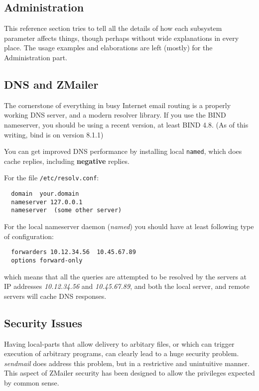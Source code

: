 \begin{htmlonly}


\section{Administration}
\end{htmlonly}

This reference section tries to tell all the details of how each
subsystem parameter affects things, though perhaps without wide
explanations in every place. The usage examples and elaborations
are left (mostly) for the Administration part.

%
%

\subsection{DNS and ZMailer}

The cornerstone of everything in busy Internet email routing is a properly
working DNS server, and a modern resolver library. If you use the BIND 
nameserver, you should be using a recent version, at least BIND 4.8.
(As of this writing, bind is on version 8.1.1)

You can get improved DNS performance by installing local {\tt named},
which does cache replies, including {\bf negative} replies.

For the file {\tt /etc/resolv.conf}:
\begin{verbatim}
  domain  your.domain
  nameserver 127.0.0.1
  nameserver  (some other server)
\end{verbatim}


For the local nameserver daemon ({\em named\/}) you should have
at least following type of configuration:
\begin{verbatim}
  forwarders 10.12.34.56  10.45.67.89
  options forward-only
\end{verbatim}

which means that all the queries are attempted to be resolved
by the servers at IP addresses {\em 10.12.34.56\/} and
{\em 10.45.67.89\/}, and both the local server, and remote
servers will cache DNS responses.


\subsection{Security Issues}


Having local-parts that allow delivery to arbitary files, or which can trigger
execution of arbitrary programs, can clearly lead to a huge security
problem.  {\em sendmail\/} does address this problem, but in a restrictive and
unintuitive manner.  This aspect of ZMailer security has been designed to
allow the privileges expected by common sense.

